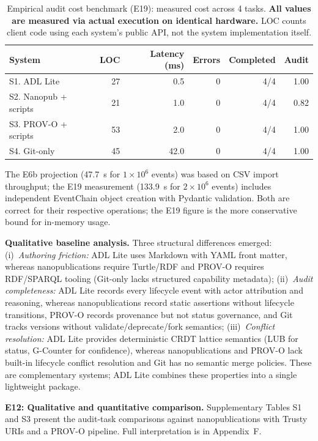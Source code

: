 \begin{table}[htbp]
\centering
\small
\caption{Empirical audit cost benchmark (E19): measured cost across 4 tasks. \textbf{All values are measured via actual execution on identical hardware.} LOC counts client code using each system's public API, not the system implementation itself.}
\label{tab:e19-benchmark}
\begin{tabular}{@{}lrrrrr@{}}
\toprule
\textbf{System} & \textbf{LOC} & \textbf{Latency (ms)} & \textbf{Errors} & \textbf{Completed} & \textbf{Audit} \\
\midrule
S1. ADL Lite & 27 & 0.5 & 0 & 4/4 & 1.00 \\
S2. Nanopub + scripts & 21 & 1.0 & 0 & 4/4 & 0.82 \\
S3. PROV-O + scripts & 53 & 2.0 & 0 & 4/4 & 1.00 \\
S4. Git-only & 45 & 42.0 & 0 & 4/4 & 1.00 \\
\bottomrule
\end{tabular}
\end{table}

The E6b projection (47.7~s for $1 \times 10^6$ events) was based on CSV import throughput; the E19 measurement (133.9~s for $2 \times 10^6$ events) includes independent EventChain object creation with Pydantic validation. Both are correct for their respective operations; the E19 figure is the more conservative bound for in-memory usage.

\textbf{Qualitative baseline analysis.} Three structural differences emerged: (i)~\emph{Authoring friction:} ADL Lite uses Markdown with YAML front matter, whereas nanopublications require Turtle/RDF and PROV-O requires RDF/SPARQL tooling (Git-only lacks structured capability metadata); (ii)~\emph{Audit completeness:} ADL Lite records every lifecycle event with actor attribution and reasoning, whereas nanopublications record static assertions without lifecycle transitions, PROV-O records provenance but not status governance, and Git tracks versions without validate/deprecate/fork semantics; (iii)~\emph{Conflict resolution:} ADL Lite provides deterministic CRDT lattice semantics (LUB for status, G-Counter for confidence), whereas nanopublications and PROV-O lack built-in lifecycle conflict resolution and Git has no semantic merge policies. These are complementary systems; ADL Lite combines these properties into a single lightweight package.

\textbf{E12: Qualitative and quantitative comparison.} Supplementary Tables S1 and S3 present the audit-task comparisons against nanopublications with Trusty URIs and a PROV-O pipeline. Full interpretation is in Appendix~F.

